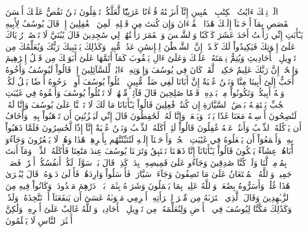 الٓرۚ تِلۡكَ ءَايَٰتُ ٱلۡكِتَٰبِ ٱلۡمُبِينِ
إِنَّآ أَنزَلۡنَٰهُ قُرۡءَٰنًا عَرَبِيّٗا لَّعَلَّكُمۡ تَعۡقِلُونَ
نَحۡنُ نَقُصُّ عَلَيۡكَ أَحۡسَنَ ٱلۡقَصَصِ بِمَآ أَوۡحَيۡنَآ إِلَيۡكَ هَٰذَا ٱلۡقُرۡءَانَ وَإِن كُنتَ مِن قَبۡلِهِۦ لَمِنَ ٱلۡغَٰفِلِينَ
إِذۡ قَالَ يُوسُفُ لِأَبِيهِ يَـٰٓأَبَتِ إِنِّي رَأَيۡتُ أَحَدَ عَشَرَ كَوۡكَبٗا وَٱلشَّمۡسَ وَٱلۡقَمَرَ رَأَيۡتُهُمۡ لِي سَٰجِدِينَ
قَالَ يَٰبُنَيَّ لَا تَقۡصُصۡ رُءۡيَاكَ عَلَىٰٓ إِخۡوَتِكَ فَيَكِيدُواْ لَكَ كَيۡدًاۖ إِنَّ ٱلشَّيۡطَٰنَ لِلۡإِنسَٰنِ عَدُوّٞ مُّبِينٞ
وَكَذَٰلِكَ يَجۡتَبِيكَ رَبُّكَ وَيُعَلِّمُكَ مِن تَأۡوِيلِ ٱلۡأَحَادِيثِ وَيُتِمُّ نِعۡمَتَهُۥ عَلَيۡكَ وَعَلَىٰٓ ءَالِ يَعۡقُوبَ كَمَآ أَتَمَّهَا عَلَىٰٓ أَبَوَيۡكَ مِن قَبۡلُ إِبۡرَٰهِيمَ وَإِسۡحَٰقَۚ إِنَّ رَبَّكَ عَلِيمٌ حَكِيمٞ
۞لَّقَدۡ كَانَ فِي يُوسُفَ وَإِخۡوَتِهِۦٓ ءَايَٰتٞ لِّلسَّآئِلِينَ
إِذۡ قَالُواْ لَيُوسُفُ وَأَخُوهُ أَحَبُّ إِلَىٰٓ أَبِينَا مِنَّا وَنَحۡنُ عُصۡبَةٌ إِنَّ أَبَانَا لَفِي ضَلَٰلٖ مُّبِينٍ
ٱقۡتُلُواْ يُوسُفَ أَوِ ٱطۡرَحُوهُ أَرۡضٗا يَخۡلُ لَكُمۡ وَجۡهُ أَبِيكُمۡ وَتَكُونُواْ مِنۢ بَعۡدِهِۦ قَوۡمٗا صَٰلِحِينَ
قَالَ قَآئِلٞ مِّنۡهُمۡ لَا تَقۡتُلُواْ يُوسُفَ وَأَلۡقُوهُ فِي غَيَٰبَتِ ٱلۡجُبِّ يَلۡتَقِطۡهُ بَعۡضُ ٱلسَّيَّارَةِ إِن كُنتُمۡ فَٰعِلِينَ
قَالُواْ يَـٰٓأَبَانَا مَا لَكَ لَا تَأۡمَ۬نَّا عَلَىٰ يُوسُفَ وَإِنَّا لَهُۥ لَنَٰصِحُونَ
أَرۡسِلۡهُ مَعَنَا غَدٗا يَرۡتَعۡ وَيَلۡعَبۡ وَإِنَّا لَهُۥ لَحَٰفِظُونَ
قَالَ إِنِّي لَيَحۡزُنُنِيٓ أَن تَذۡهَبُواْ بِهِۦ وَأَخَافُ أَن يَأۡكُلَهُ ٱلذِّئۡبُ وَأَنتُمۡ عَنۡهُ غَٰفِلُونَ
قَالُواْ لَئِنۡ أَكَلَهُ ٱلذِّئۡبُ وَنَحۡنُ عُصۡبَةٌ إِنَّآ إِذٗا لَّخَٰسِرُونَ
فَلَمَّا ذَهَبُواْ بِهِۦ وَأَجۡمَعُوٓاْ أَن يَجۡعَلُوهُ فِي غَيَٰبَتِ ٱلۡجُبِّۚ وَأَوۡحَيۡنَآ إِلَيۡهِ لَتُنَبِّئَنَّهُم بِأَمۡرِهِمۡ هَٰذَا وَهُمۡ لَا يَشۡعُرُونَ
وَجَآءُوٓ أَبَاهُمۡ عِشَآءٗ يَبۡكُونَ
قَالُواْ يَـٰٓأَبَانَآ إِنَّا ذَهَبۡنَا نَسۡتَبِقُ وَتَرَكۡنَا يُوسُفَ عِندَ مَتَٰعِنَا فَأَكَلَهُ ٱلذِّئۡبُۖ وَمَآ أَنتَ بِمُؤۡمِنٖ لَّنَا وَلَوۡ كُنَّا صَٰدِقِينَ
وَجَآءُو عَلَىٰ قَمِيصِهِۦ بِدَمٖ كَذِبٖۚ قَالَ بَلۡ سَوَّلَتۡ لَكُمۡ أَنفُسُكُمۡ أَمۡرٗاۖ فَصَبۡرٞ جَمِيلٞۖ وَٱللَّهُ ٱلۡمُسۡتَعَانُ عَلَىٰ مَا تَصِفُونَ
وَجَآءَتۡ سَيَّارَةٞ فَأَرۡسَلُواْ وَارِدَهُمۡ فَأَدۡلَىٰ دَلۡوَهُۥۖ قَالَ يَٰبُشۡرَىٰ هَٰذَا غُلَٰمٞۚ وَأَسَرُّوهُ بِضَٰعَةٗۚ وَٱللَّهُ عَلِيمُۢ بِمَا يَعۡمَلُونَ
وَشَرَوۡهُ بِثَمَنِۭ بَخۡسٖ دَرَٰهِمَ مَعۡدُودَةٖ وَكَانُواْ فِيهِ مِنَ ٱلزَّـٰهِدِينَ
وَقَالَ ٱلَّذِي ٱشۡتَرَىٰهُ مِن مِّصۡرَ لِٱمۡرَأَتِهِۦٓ أَكۡرِمِي مَثۡوَىٰهُ عَسَىٰٓ أَن يَنفَعَنَآ أَوۡ نَتَّخِذَهُۥ وَلَدٗاۚ وَكَذَٰلِكَ مَكَّنَّا لِيُوسُفَ فِي ٱلۡأَرۡضِ وَلِنُعَلِّمَهُۥ مِن تَأۡوِيلِ ٱلۡأَحَادِيثِۚ وَٱللَّهُ غَالِبٌ عَلَىٰٓ أَمۡرِهِۦ وَلَٰكِنَّ أَكۡثَرَ ٱلنَّاسِ لَا يَعۡلَمُونَ
